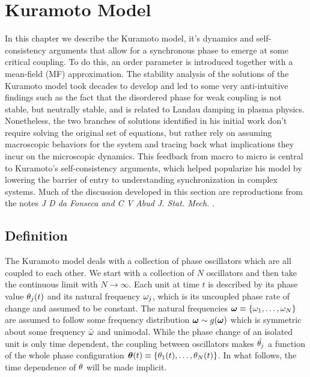\chapter{Kuramoto Model}
\label{chap:kuramoto}


In this chapter we describe the Kuramoto model, it's dynamics and self-consistency arguments that allow for a synchronous phase to
emerge at some critical coupling. To do this, an order parameter is introduced together with a mean-field (MF) approximation. The
stability analysis of the solutions of the Kuramoto model took decades to develop and led to some very anti-intuitive findings such as
the fact that the disordered phase for weak coupling is not stable, but neutrally stable, and is related to Landau damping in plasma
physics.  Nonetheless, the two branches of solutions identified in his initial work don't require solving the original set of
equations, but rather rely on assuming macroscopic behaviors for the system and tracing back what implications they incur on the
microscopic dynamics.  This feedback from macro to micro is central to Kuramoto's self-consistency arguments, which helped popularize
his model by lowering the barrier of entry to understanding synchronization in complex systems. Much of the discussion developed in
this section are reproductions from the notes \textit{J D da Fonseca and C V Abud J. Stat. Mech.} \cite{da_Fonseca_2018}.


\section{Definition}

The Kuramoto model deals with a collection of phase oscillators which are all coupled to each other. We start with a collection of $N$
oscillators and then take the continuous limit with $N \to \infty$. Each unit at time $t$ is described by its phase value $\theta_j(t)$
and its natural frequency $\omega_j$, which is its uncoupled phase rate of change and assumed to be constant. The natural frequencies
$\bm{\omega}\equiv \{\omega_1,\dots,\omega_N\}$ are assumed to follow some frequency distribution $\bm{\omega} \sim g(\bm{\omega})$
which is symmetric about some frequency $\bar{\omega}$ and unimodal. While the phase change of an isolated unit is only time dependent,
the coupling between oscillators makes $\dot{\theta_j}$ a function of the whole phase configuration $\bm{\theta}(t) \equiv \{
\theta_1(t), \dots, \theta_N(t)\}$. In what follows, the time dependence of $\theta$ will be made implicit.

